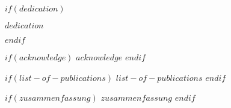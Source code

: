 \documentclass[11pt, a4paper, twosided]{book}
\newcommand{\thesisauthor}{$author$}
\newcommand{\thesisdate}{$date$}
\begin{document}
\newpage
\thispagestyle{empty}
%
%
%
%

\pagestyle{empty} %

$if(dedication)$
\vspace*{\fill}
\begin{center}
\textit{$dedication$}
\end{center}
\vspace*{\fill}
\newpage\null\thispagestyle{empty}\newpage
$endif$

\pagestyle{plain}
\setcounter{page}{1}    %
$if(acknowledge)$
\newpage
$acknowledge$
\newpage\null\newpage
$endif$


$if(list-of-publications)$
    $list-of-publications$
\newpage\null\newpage
$endif$

$if(zusammenfassung)$
    $zusammenfassung$
$endif$
\newpage\null\newpage
\end{document}
